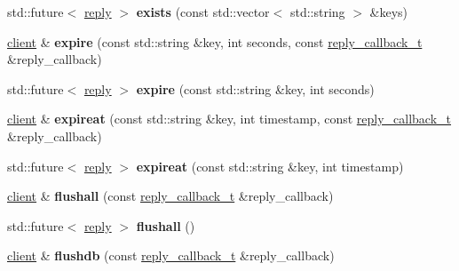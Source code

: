 \begin{DoxyCompactItemize}
std\+::future$<$ \hyperlink{classcpp__redis_1_1reply}{reply} $>$ {\bfseries exists} (const std\+::vector$<$ std\+::string $>$ \&keys)
\item 
\mbox{\label{classcpp__redis_1_1client_ab2c50e9f37a4e6a5dff059c991dbd15e}} 
\hyperlink{classcpp__redis_1_1client}{client} \& {\bfseries expire} (const std\+::string \&key, int seconds, const \hyperlink{classcpp__redis_1_1client_a061a1140d36d2eaeda82b09a0bb3f9f2}{reply\+\_\+callback\+\_\+t} \&reply\+\_\+callback)
\item 
\mbox{\label{classcpp__redis_1_1client_aeb2f8b475d5adf23a25ae066e1ff45f4}} 
std\+::future$<$ \hyperlink{classcpp__redis_1_1reply}{reply} $>$ {\bfseries expire} (const std\+::string \&key, int seconds)
\item 
\mbox{\label{classcpp__redis_1_1client_a7b5e1b089d68a0cb71f72fb6aecb0a63}} 
\hyperlink{classcpp__redis_1_1client}{client} \& {\bfseries expireat} (const std\+::string \&key, int timestamp, const \hyperlink{classcpp__redis_1_1client_a061a1140d36d2eaeda82b09a0bb3f9f2}{reply\+\_\+callback\+\_\+t} \&reply\+\_\+callback)
\item 
\mbox{\label{classcpp__redis_1_1client_af344a8ae784f7d4d529ea9cab276906c}} 
std\+::future$<$ \hyperlink{classcpp__redis_1_1reply}{reply} $>$ {\bfseries expireat} (const std\+::string \&key, int timestamp)
\item 
\mbox{\label{classcpp__redis_1_1client_a64e5730ff850ce517709e4e7fc511309}} 
\hyperlink{classcpp__redis_1_1client}{client} \& {\bfseries flushall} (const \hyperlink{classcpp__redis_1_1client_a061a1140d36d2eaeda82b09a0bb3f9f2}{reply\+\_\+callback\+\_\+t} \&reply\+\_\+callback)
\item 
\mbox{\label{classcpp__redis_1_1client_a78f879507f060ba538de5db80a5e3009}} 
std\+::future$<$ \hyperlink{classcpp__redis_1_1reply}{reply} $>$ {\bfseries flushall} ()
\item 
\mbox{\label{classcpp__redis_1_1client_a8334064cd300cb19f0760ad7c4c84673}} 
\hyperlink{classcpp__redis_1_1client}{client} \& {\bfseries flushdb} (const \hyperlink{classcpp__redis_1_1client_a061a1140d36d2eaeda82b09a0bb3f9f2}{reply\+\_\+callback\+\_\+t} \&reply\+\_\+callback)

\end{DoxyCompactItemize}
